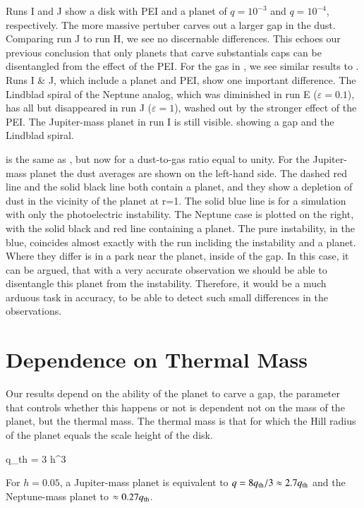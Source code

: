 \documentclass[onecolumn]{report}
\newcommand{\epsi}{\varepsilon}
\begin{document}
Runs I and J show a disk with PEI and a planet of $q=10^{-3}$ and $q=10^{-4}$, respectively. The more massive pertuber carves out a larger gap in the dust. Comparing run J to run H, we see no discernable differences. This echoes our previous conclusion that only planets that carve substantials caps can be disentangled from the effect of the PEI. For the gas in , we see similar results to . Runs I \& J, which include a planet and PEI, show one important difference. The Lindblad spiral of the Neptune analog, which was diminished in run E ($\epsi=0.1$), has all but disappeared in run J ($\epsi=1$), washed out by the stronger effect of the PEI. The Jupiter-mass planet in run I is still visible. showing a gap and the Lindblad spiral.


 is the same as , but now for a dust-to-gas ratio equal to unity. For the Jupiter-mass planet the dust averages are shown on the left-hand side. The dashed red line and the solid black line both contain a planet, and they show a depletion of dust in the vicinity of the planet at r=1. The solid blue line is for a simulation with only the photoelectric instability. The Neptune case is plotted on the right, with the solid black and red line containing a planet. The pure instability, in the blue, coincides almost exactly with the run incliding the instability and a planet. Where they differ is in a park near the planet, inside of the gap. In this case, it can be argued, that with a very accurate observation we should be able to disentangle this planet from the instability. Therefore, it would be a much arduous task in accuracy, to be able to detect such small differences in the observations. 

\section{Dependence on Thermal Mass}

Our results depend on the ability of the planet to carve a gap, the parameter that controls whether this happens or not is dependent not on the mass of the planet, but the thermal mass. The thermal mass is that for which the Hill radius of the planet equals the scale height of the disk.

\beq
q_{\rm th} = 3 h^3
\eeq

For $h=0.05$, a Jupiter-mass planet is equivalent to $q=8q_{\rm th}/3\approx 2.7 q_{\rm th}$ and the Neptune-mass planet to $\approx 0.27q_{\rm th}$.
\end{document}
